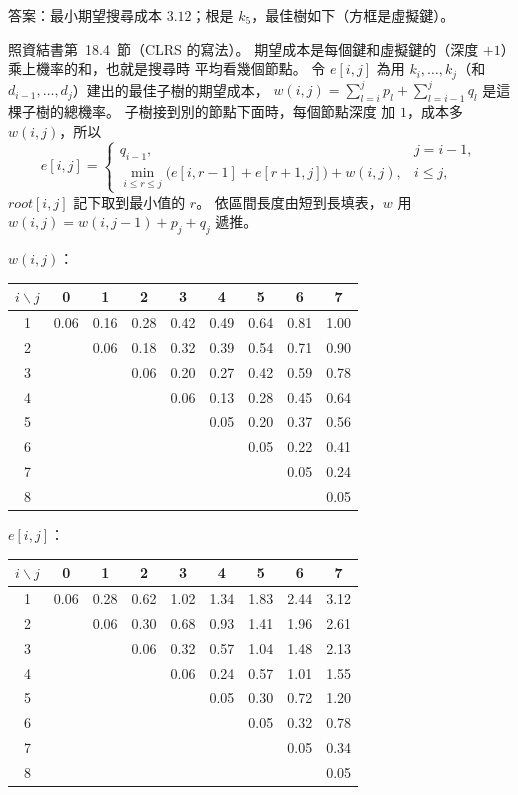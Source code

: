 \begin{pastsoln}
答案：最小期望搜尋成本 $3.12$；根是 $k_5$，最佳樹如下（方框是虛擬鍵）。

照資結書第~18.4~節（CLRS 的寫法）。 期望成本是每個鍵和虛擬鍵的（深度 $+ 1$）乘上機率的和，也就是搜尋時
平均看幾個節點。 令 $e[i, j]$ 為用 $k_i, \ldots, k_j$（和 $d_{i-1}, \ldots, d_j$）建出的最佳子樹的期望成本，
$w(i, j) = \sum_{l=i}^{j} p_l + \sum_{l=i-1}^{j} q_l$ 是這棵子樹的總機率。 子樹接到別的節點下面時，每個節點深度
加 $1$，成本多 $w(i, j)$，所以
\[
e[i, j] = \begin{cases}
q_{i-1}, & j = i - 1,\\
\min_{i \le r \le j}\bigl(e[i, r-1] + e[r+1, j]\bigr) + w(i, j), & i \le j,
\end{cases}
\]
$\mathit{root}[i, j]$ 記下取到最小值的 $r$。 依區間長度由短到長填表，$w$ 用 $w(i, j) = w(i, j-1) + p_j + q_j$
遞推。

\textbf{$w(i, j)$}：
\begin{center}
\small
\begin{tabular}{c|cccccccc}
\toprule
$i \backslash j$ & 0 & 1 & 2 & 3 & 4 & 5 & 6 & 7 \\
\midrule
1 & 0.06 & 0.16 & 0.28 & 0.42 & 0.49 & 0.64 & 0.81 & 1.00 \\
2 &  & 0.06 & 0.18 & 0.32 & 0.39 & 0.54 & 0.71 & 0.90 \\
3 &  &  & 0.06 & 0.20 & 0.27 & 0.42 & 0.59 & 0.78 \\
4 &  &  &  & 0.06 & 0.13 & 0.28 & 0.45 & 0.64 \\
5 &  &  &  &  & 0.05 & 0.20 & 0.37 & 0.56 \\
6 &  &  &  &  &  & 0.05 & 0.22 & 0.41 \\
7 &  &  &  &  &  &  & 0.05 & 0.24 \\
8 &  &  &  &  &  &  &  & 0.05 \\
\bottomrule
\end{tabular}
\end{center}

\textbf{$e[i, j]$}：
\begin{center}
\small
\begin{tabular}{c|cccccccc}
\toprule
$i \backslash j$ & 0 & 1 & 2 & 3 & 4 & 5 & 6 & 7 \\
\midrule
1 & 0.06 & 0.28 & 0.62 & 1.02 & 1.34 & 1.83 & 2.44 & 3.12 \\
2 &  & 0.06 & 0.30 & 0.68 & 0.93 & 1.41 & 1.96 & 2.61 \\
3 &  &  & 0.06 & 0.32 & 0.57 & 1.04 & 1.48 & 2.13 \\
4 &  &  &  & 0.06 & 0.24 & 0.57 & 1.01 & 1.55 \\
5 &  &  &  &  & 0.05 & 0.30 & 0.72 & 1.20 \\
6 &  &  &  &  &  & 0.05 & 0.32 & 0.78 \\
7 &  &  &  &  &  &  & 0.05 & 0.34 \\
8 &  &  &  &  &  &  &  & 0.05 \\
\bottomrule
\end{tabular}
\end{center}


\end{pastsoln}
